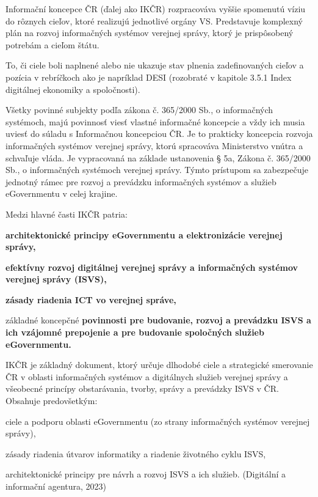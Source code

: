 Informační koncepce ČR (ďalej ako IKČR) rozpracováva vyššie spomenutú víziu do rôznych cieľov, ktoré realizujú jednotlivé orgány VS. Predstavuje komplexný plán na rozvoj informačných systémov verejnej správy, ktorý je prispôsobený potrebám a cieľom štátu.

To, či ciele boli naplnené alebo nie ukazuje stav plnenia zadefinovaných cieľov a pozícia v rebríčkoch ako je napríklad DESI (rozobraté v kapitole 3.5.1 Index digitálnej ekonomiky a spoločnosti).

Všetky povinné subjekty podľa zákona  č. 365/2000 Sb., o informačných systémoch, majú povinnosť viesť vlastné informačné koncepcie a vždy ich musia uviesť do súladu s Informačnou koncepciou ČR. Je to prakticky koncepcia rozvoja informačných systémov verejnej správy, ktorú spracováva Ministerstvo vnútra a schvaľuje vláda. Je vypracovaná na základe ustanovenia § 5a, Zákona č. 365/2000 Sb., o informačných systémoch verejnej správy. Týmto prístupom sa zabezpečuje jednotný rámec pre rozvoj a prevádzku informačných systémov a služieb eGovernmentu v celej krajine.

Medzi hlavné časti IKČR patria:

\startitemize
\item{\start\bf architektonické principy \stop eGovernmentu a elektronizácie verejnej správy,}
\item{\start \bf efektívny rozvoj \stop digitálnej verejnej správy a informačných systémov verejnej správy (ISVS),}
\item{\start\bf zásady \stop riadenia ICT vo verejnej správe,}
\item{základné koncepčné \start \bf povinnosti \stop pre budovanie, rozvoj a prevádzku ISVS a ich vzájomné prepojenie a pre budovanie spoločných služieb eGovernmentu.}
\stopitemize

IKČR je základný dokument, ktorý určuje dlhodobé ciele a strategické smerovanie ČR v oblasti informačných systémov a digitálnych služieb verejnej správy a všeobecné princípy obstarávania, tvorby, správy a prevádzky ISVS v ČR. Obsahuje predovšetkým:
\startitemize
\item{ciele a podporu oblasti eGovernmentu (zo strany informačných systémov verejnej správy),}
\item{zásady riadenia útvarov informatiky a riadenie životného cyklu ISVS,}
\item{architektonické principy pre návrh a rozvoj ISVS a ich služieb. \scr(Digitální a informační agentura, 2023)}
\stopitemize

